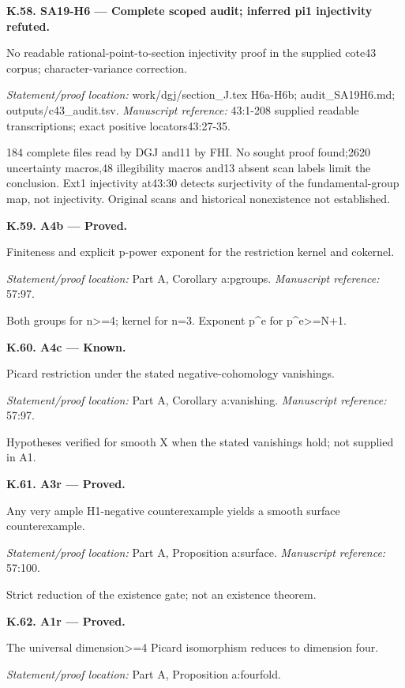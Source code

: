\par\medskip\noindent\textbf{K.58. SA19-H6 --- Complete scoped audit; inferred pi1 injectivity refuted.}\par
No readable rational-point-to-section injectivity proof in the supplied cote43 corpus; character-variance correction.
\par\emph{Statement/proof location:} work/dgj/section\_J.tex H6a-H6b; audit\_SA19H6.md; outputs/c43\_audit.tsv.
\emph{Manuscript reference:} 43:1-208 supplied readable transcriptions; exact positive locators43:27-35.
\par 184 complete files read by DGJ and11 by FHI. No sought proof found;2620 uncertainty macros,48 illegibility macros and13 absent scan labels limit the conclusion. Ext1 injectivity at43:30 detects surjectivity of the fundamental-group map, not injectivity. Original scans and historical nonexistence not established.
\par\medskip\noindent\textbf{K.59. A4b --- Proved.}\par
Finiteness and explicit p-power exponent for the restriction kernel and cokernel.
\par\emph{Statement/proof location:} Part A, Corollary a:pgroups.
\emph{Manuscript reference:} 57:97.
\par Both groups for n>=4; kernel for n=3. Exponent p\textasciicircum{}e for p\textasciicircum{}e>=N+1.
\par\medskip\noindent\textbf{K.60. A4c --- Known.}\par
Picard restriction under the stated negative-cohomology vanishings.
\par\emph{Statement/proof location:} Part A, Corollary a:vanishing.
\emph{Manuscript reference:} 57:97.
\par Hypotheses verified for smooth X when the stated vanishings hold; not supplied in A1.
\par\medskip\noindent\textbf{K.61. A3r --- Proved.}\par
Any very ample H1-negative counterexample yields a smooth surface counterexample.
\par\emph{Statement/proof location:} Part A, Proposition a:surface.
\emph{Manuscript reference:} 57:100.
\par Strict reduction of the existence gate; not an existence theorem.
\par\medskip\noindent\textbf{K.62. A1r --- Proved.}\par
The universal dimension>=4 Picard isomorphism reduces to dimension four.
\par\emph{Statement/proof location:} Part A, Proposition a:fourfold.
